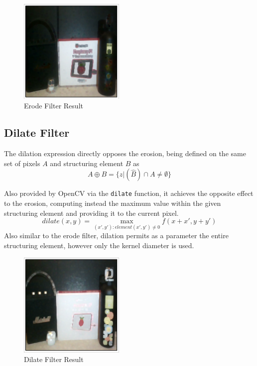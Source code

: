 \begin{figure}[H]
	\includegraphics[width=0.45\textwidth, height=0.45\textwidth]{resources/Erode_2.png}
	\caption{Erode Filter Result}
\end{figure}

\subsection{Dilate Filter}

The dilation expression directly opposes the erosion, being defined on the same set of pixels \(A\) and
structuring element \(B\) \cite{dipBook} as
\[A \oplus B = \{z | (\hat{B}) \cap A \neq \emptyset\}\]

Also provided by OpenCV via the \verb|dilate| function, it achieves the opposite effect to the erosion,
computing instead the maximum value within the given structuring element and providing it to the current
pixel. \cite{opencvImproc}
\[dilate(x, y) = \max\limits_{(x', y'): element(x', y') \neq 0} f(x + x', y + y')\]
Also similar to the erode filter, dilation permits as a parameter the entire structuring element, however
only the kernel diameter is used.

\begin{figure}[H]
	\includegraphics[width=0.45\textwidth, height=0.45\textwidth]{resources/Dilate_2.png}
	\caption{Dilate Filter Result}
\end{figure}

